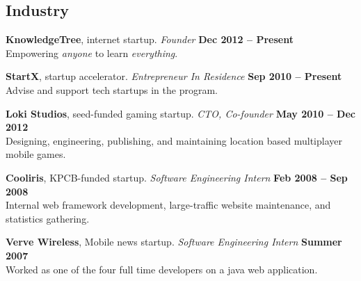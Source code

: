 \documentclass[margin,line]{resume}
\begin{document}
\begin{resume}





    \section{\mysidestyle Industry}

    \textbf{KnowledgeTree}, internet startup.
        \textsl{Founder}
        \hfill \textbf{Dec 2012 -- Present}\\
    Empowering \textsl{anyone} to learn \textsl{everything}.

    \textbf{StartX}, startup accelerator.
        \textsl{Entrepreneur In Residence}
        \hfill \textbf{Sep 2010 -- Present}\\
    Advise and support tech startups in the program.

    \textbf{Loki Studios}, seed-funded gaming startup.
        \textsl{CTO, Co-founder}
        \hfill \textbf{May 2010 -- Dec 2012}\\
    Designing, engineering, publishing, and maintaining location based
    multiplayer mobile games.

    \textbf{Cooliris}, KPCB-funded startup.
          \textsl{Software Engineering Intern}
          \hfill \textbf{Feb 2008 -- Sep 2008}\\
    Internal web framework development, large-traffic website maintenance,
    and statistics gathering.

    \textbf{Verve Wireless}, Mobile news startup.
      \textsl{Software Engineering Intern}
      \hfill \textbf{Summer 2007}\\
    Worked as one of the four full time developers on a java web application.


\end{resume}
\end{document}

